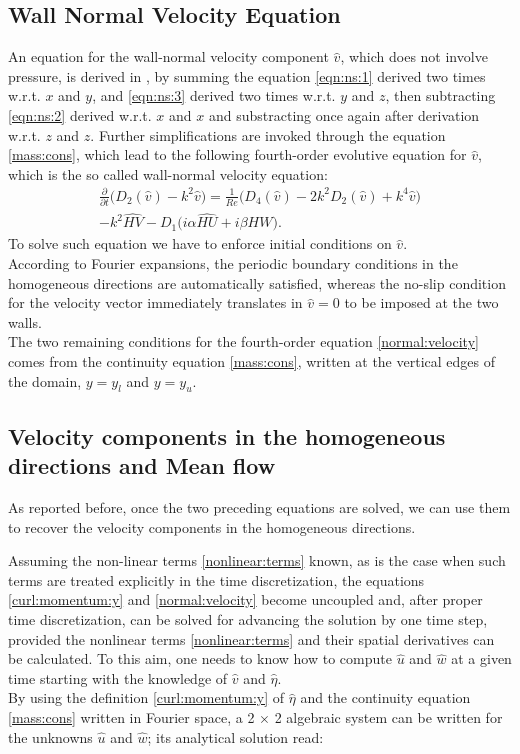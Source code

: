 \subsection{Wall Normal Velocity Equation}
An equation for the wall-normal velocity component $\hat{v}$, which does not involve pressure, is derived in \cite{kim_moin_moser}, by summing the equation \eqref{eqn:ns:1} derived two times w.r.t. $x$ and $y$, and \eqref{eqn:ns:3} derived two times w.r.t. $y$ and $z$, then subtracting \eqref{eqn:ns:2} derived w.r.t. $x$ and $x$ and substracting once again after derivation w.r.t. $z$ and $z$.
Further simplifications are invoked through the equation \eqref{mass:cons}, which lead to the following fourth-order evolutive equation for $\hat{v}$, which is the so called wall-normal velocity equation:
\begin{multline}
\label{normal:velocity}
\frac{\partial}{\partial t} \big( D_{2}(\hat{v}) - k^{2} \hat{v} \big) = \frac{1}{Re} \big( D_{4}(\hat{v}) - 2k^{2} D_{2}(\hat{v}) + k^{4} \hat{v} \big) \\
	-k^{2} \widehat{HV} - D_{1} \big(  i \alpha \widehat{HU} + i \beta \widehat{HW} \big).
\end{multline}
To solve such equation we have to enforce initial conditions on $\hat{v}$.\\
According to Fourier expansions, the periodic boundary conditions in the homogeneous directions are automatically satisfied, whereas the no-slip condition for the velocity vector immediately translates in $\hat{v} = 0$ to be imposed at the two walls.\\
The two remaining conditions for the fourth-order equation \eqref{normal:velocity} comes from the continuity equation \eqref{mass:cons}, written at the vertical edges of the domain, $y= y_{l}$ and $y=y_{u}$.


\subsection{Velocity components in the homogeneous directions and Mean flow}
As reported before, once the two preceding equations are solved, we can use them to recover the velocity components in the homogeneous directions.\par
Assuming the non-linear terms \eqref{nonlinear:terms} known, as is the case when such terms are treated explicitly in the time discretization, the equations \eqref{curl:momentum:y} and \eqref{normal:velocity} become uncoupled and, after proper time discretization, can be solved for advancing the solution by one time step, provided the nonlinear terms \eqref{nonlinear:terms} and their spatial derivatives can be calculated.
To this aim, one needs to know how to compute $\hat{u}$ and $\hat{w}$ at a given time starting with the knowledge of $\hat{v}$ and $\hat{\eta}$. \\
By using the definition \eqref{curl:momentum:y} of $\hat{\eta}$ and the continuity equation \eqref{mass:cons} written in Fourier space, a 2 $\times$ 2 algebraic system can be written for the unknowns $\hat{u}$ and $\hat{w}$; its analytical solution read:


